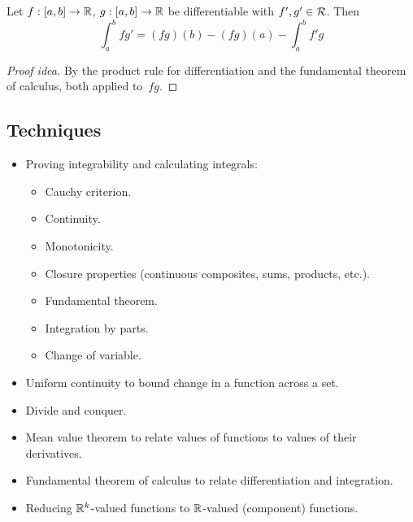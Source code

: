 \begin{cor}
Let \(f:[a,b]\to\mathbb{R}\), \(g:[a,b]\to\mathbb{R}\) be differentiable with \(f',g'\in\mathcal{R}\). Then
\[\int_a^b fg'=(fg)(b)-(fg)(a)-\int_a^b f'g\]
\end{cor}
\begin{proof}[Proof idea]
By the product rule for differentiation and the fundamental theorem of calculus, both applied to~\(fg\).
\end{proof}

\subsection*{Techniques}
\begin{itemize}[itemsep=0pt]
\item Proving integrability and calculating integrals:
\begin{itemize}[itemsep=0pt]
\item Cauchy criterion.
\item Continuity.
\item Monotonicity.
\item Closure properties (continuous composites, sums, products, etc.).
\item Fundamental theorem.
\item Integration by parts.
\item Change of variable.
\end{itemize}
\item Uniform continuity to bound change in a function across a set.
\item Divide and conquer.
\item Mean value theorem to relate values of functions to values of their derivatives.
\item Fundamental theorem of calculus to relate differentiation and integration.
\item Reducing \(\mathbb{R}^k\)-valued functions to \(\mathbb{R}\)-valued (component) functions.
\end{itemize}
